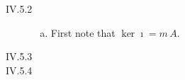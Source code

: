 \begin{description}
\item[IV.5.2]
\begin{enumerate}[(a)]
\item First note that $\ker \imath = m\,A$.
\end{enumerate}
\item[IV.5.3]
\item[IV.5.4]
\end{description}
